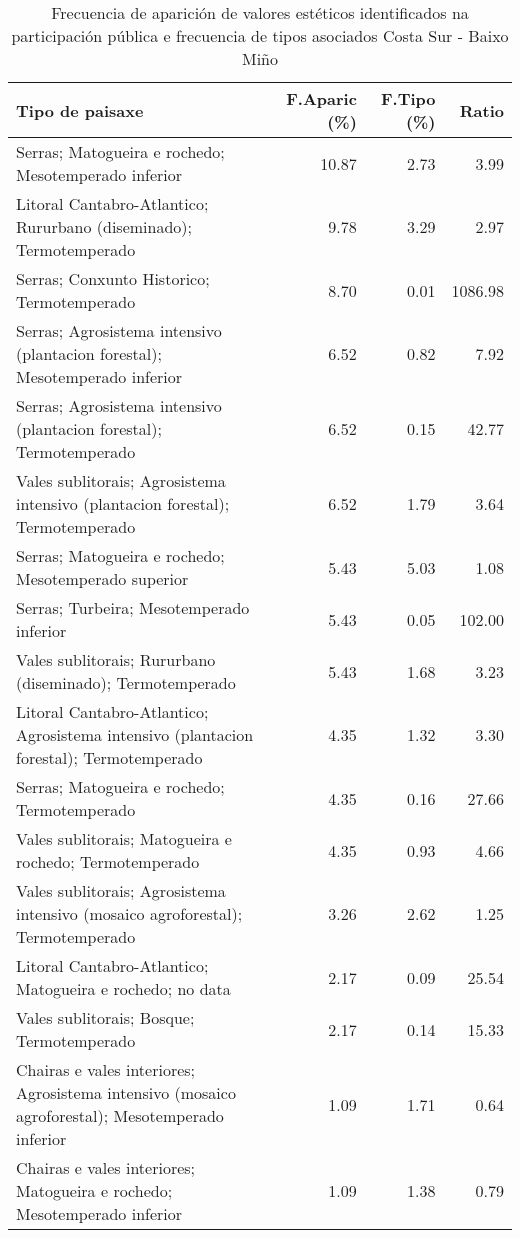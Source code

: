 \begin{table}[p]
\centering
\caption{Frecuencia de aparición de valores estéticos identificados na participación pública e frecuencia de tipos asociados Costa Sur - Baixo Miño} 
\label{vsixotest3}
\begin{tabular}{lrrr}
  \hline
Tipo de paisaxe & F.Aparic (\%) & F.Tipo (\%) & Ratio \\ 
  \hline
Serras; Matogueira e rochedo; Mesotemperado inferior & 10.87 & 2.73 & 3.99 \\ 
  Litoral Cantabro-Atlantico; Rururbano (diseminado); Termotemperado & 9.78 & 3.29 & 2.97 \\ 
  Serras; Conxunto Historico; Termotemperado & 8.70 & 0.01 & 1086.98 \\ 
  Serras; Agrosistema intensivo (plantacion forestal); Mesotemperado inferior & 6.52 & 0.82 & 7.92 \\ 
  Serras; Agrosistema intensivo (plantacion forestal); Termotemperado & 6.52 & 0.15 & 42.77 \\ 
  Vales sublitorais; Agrosistema intensivo (plantacion forestal); Termotemperado & 6.52 & 1.79 & 3.64 \\ 
  Serras; Matogueira e rochedo; Mesotemperado superior & 5.43 & 5.03 & 1.08 \\ 
  Serras; Turbeira; Mesotemperado inferior & 5.43 & 0.05 & 102.00 \\ 
  Vales sublitorais; Rururbano (diseminado); Termotemperado & 5.43 & 1.68 & 3.23 \\ 
  Litoral Cantabro-Atlantico; Agrosistema intensivo (plantacion forestal); Termotemperado & 4.35 & 1.32 & 3.30 \\ 
  Serras; Matogueira e rochedo; Termotemperado & 4.35 & 0.16 & 27.66 \\ 
  Vales sublitorais; Matogueira e rochedo; Termotemperado & 4.35 & 0.93 & 4.66 \\ 
  Vales sublitorais; Agrosistema intensivo (mosaico agroforestal); Termotemperado & 3.26 & 2.62 & 1.25 \\ 
  Litoral Cantabro-Atlantico; Matogueira e rochedo; no data & 2.17 & 0.09 & 25.54 \\ 
  Vales sublitorais; Bosque; Termotemperado & 2.17 & 0.14 & 15.33 \\ 
  Chairas e vales interiores; Agrosistema intensivo (mosaico agroforestal); Mesotemperado inferior & 1.09 & 1.71 & 0.64 \\ 
  Chairas e vales interiores; Matogueira e rochedo; Mesotemperado inferior & 1.09 & 1.38 & 0.79 \\ 

\end{tabular}
\end{table}
